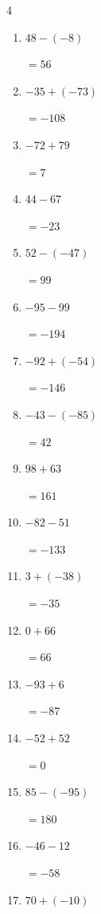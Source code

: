 \begin{multicols}{4}
\begin{enumerate}
        $=-85$

  \item $48-(-8)$

        $=56$

  \item $-35+(-73)$

        $=-108$

  \item $-72+79$

        $=7$

  \item $44-67$

        $=-23$

  \item $52-(-47)$

        $=99$

  \item $-95-99$

        $=-194$

  \item $-92+(-54)$

        $=-146$

  \item $-43-(-85)$

        $=42$

  \item $98+63$

        $=161$

  \item $-82-51$

        $=-133$

  \item $3+(-38)$

        $=-35$

  \item $0+66$

        $=66$

  \item $-93+6$

        $=-87$

  \item $-52+52$

        $=0$

  \item $85-(-95)$

        $=180$

  \item $-46-12$

        $=-58$

  \item $70+(-10)$


\end{enumerate}
\end{multicols}
